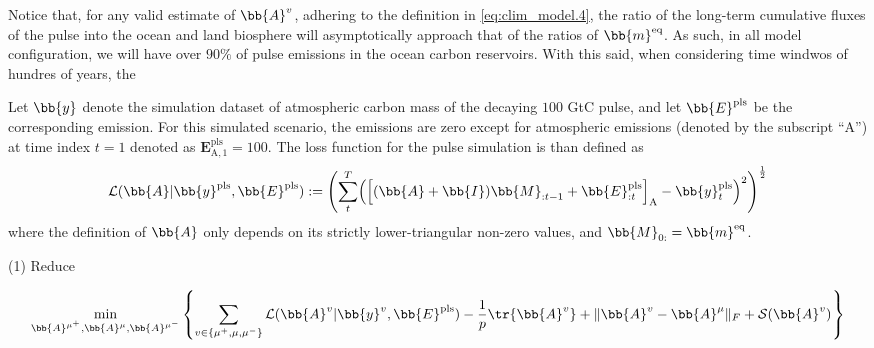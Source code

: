 
\newpage


Notice that, for any valid estimate of $\bb{A}^v$, adhering to the definition in \eqref{eq:clim_model.4}, the ratio of the long-term cumulative fluxes of the pulse into the ocean and land biosphere will asymptotically approach that of the ratios of $\bb{m}^{\text{eq}}$.
As such, in all model configuration, we will have over $90\%$ of pulse emissions in the ocean carbon reservoirs. 
With this said, when considering time windwos of hundres of years, the 















Let $\bb{y}$ denote the simulation dataset of atmospheric carbon mass of the decaying $100$ GtC pulse, and let $\bb{E}^{\text{pls}}$ be the corresponding emission. 
For this simulated scenario, the emissions are zero except for atmospheric emissions (denoted by the subscript ``A'') at time index $t=1$ denoted as $\mathbf{E}^{\text{pls}}_{\text{A},1}=100$. 
The loss function for the pulse simulation is than defined as 
%
\begin{align} \label{eq:clim_model.5}
	\mathcal{L}(\bb{A}|\bb{y}^{\text{pls}},\bb{E}^{\text{pls}}) 
	:= \Biggl( 
	\sum_{t}^T \Bigl(  
	\Bigl[ ( \bb{A} + \bb{I})\bb{M}_{:t-1}+\bb{E}^{\text{pls}}_{:t}\Bigr]_{\text{A}}-\bb{y}^{\text{pls}}_{t} 
	\Bigr)^{2} 
	\Biggr)^{\frac{1}{2}}
\end{align}
%
where the definition of $\bb{A}$ only depends on its strictly lower-triangular non-zero values, and $\bb{M}_{0:}=\bb{m}^{\text{eq}}$. 


(1) Reduce 




\begin{align}
	\underset{  \bb{A}^{\mu^+},\bb{A}^{\mu},\bb{A}^{\mu^-}}{\text{min}} \left\{ \sum_{ v \in \{\mu^+,\mu,\mu^-\} }    \mathcal{L}(\bb{A}^v|\bb{y}^{v},\bb{E}^{\text{pls}})  - \frac{1}{p} \tr{\bb{A}^{v}} + \| \bb{A}^{v} - \bb{A}^{\mu}  \|_{F}  + \mathcal{S}(\bb{A}^{v})^{} \right \}
\end{align}

















